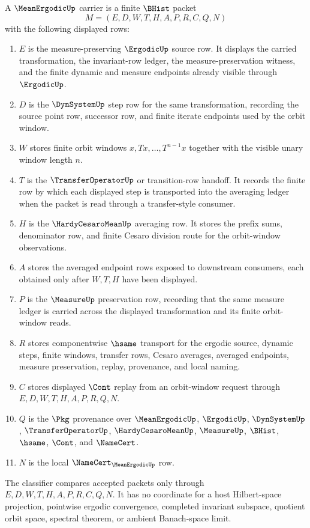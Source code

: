 \begin{definition}
\label{def:mean-ergodic-carrier}
A $\MeanErgodicUp$ carrier is a finite $\BHist$ packet
$$
M=(E,D,W,T,H,A,P,R,C,Q,N)
$$
with the following displayed rows:
\begin{enumerate}
\item $E$ is the measure-preserving $\ErgodicUp$ source row. It displays the carried transformation, the invariant-row ledger, the measure-preservation witness, and the finite dynamic and measure endpoints already visible through $\ErgodicUp$.
\item $D$ is the $\DynSystemUp$ step row for the same transformation, recording the source point row, successor row, and finite iterate endpoints used by the orbit window.
\item $W$ stores finite orbit windows $x,Tx,\ldots,T^{n-1}x$ together with the visible unary window length $n$.
\item $T$ is the $\TransferOperatorUp$ or transition-row handoff. It records the finite row by which each displayed step is transported into the averaging ledger when the packet is read through a transfer-style consumer.
\item $H$ is the $\HardyCesaroMeanUp$ averaging row. It stores the prefix sums, denominator row, and finite Cesaro division route for the orbit-window observations.
\item $A$ stores the averaged endpoint rows exposed to downstream consumers, each obtained only after $W,T,H$ have been displayed.
\item $P$ is the $\MeasureUp$ preservation row, recording that the same measure ledger is carried across the displayed transformation and its finite orbit-window reads.
\item $R$ stores componentwise $\hsame$ transport for the ergodic source, dynamic steps, finite windows, transfer rows, Cesaro averages, averaged endpoints, measure preservation, replay, provenance, and local naming.
\item $C$ stores displayed $\Cont$ replay from an orbit-window request through $E,D,W,T,H,A,P,R,Q,N$.
\item $Q$ is the $\Pkg$ provenance over $\MeanErgodicUp$, $\ErgodicUp$, $\DynSystemUp$, $\TransferOperatorUp$, $\HardyCesaroMeanUp$, $\MeasureUp$, $\BHist$, $\hsame$, $\Cont$, and $\NameCert$.
\item $N$ is the local $\NameCert_{\MeanErgodicUp}$ row.
\end{enumerate}
The classifier compares accepted packets only through $E,D,W,T,H,A,P,R,C,Q,N$. It has no coordinate for a host Hilbert-space projection, pointwise ergodic convergence, completed invariant subspace, quotient orbit space, spectral theorem, or ambient Banach-space limit.
\end{definition}


